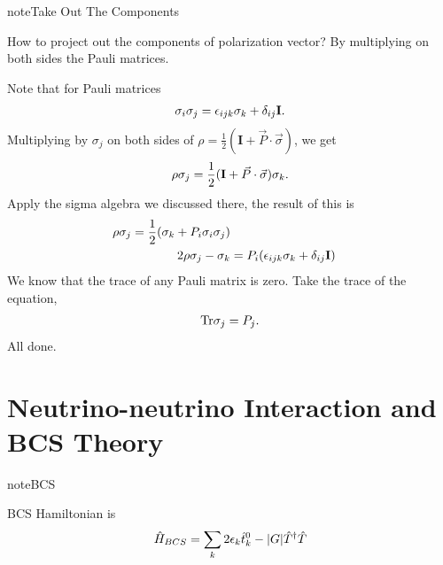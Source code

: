 \documentclass[letterpaper,12pt,english]{sphinxmanual}
\begin{document}
\begin{notice}{note}{Take Out The Components}

How to project out the components of polarization vector? By multiplying on both sides the Pauli matrices.

Note that for Pauli matrices
\begin{gather}
\begin{split}\sigma_i \sigma_j = \epsilon_{ijk}\sigma_k + \delta_{ij}\mathbf I.\end{split}\notag
\end{gather}
Multiplying by \(\sigma_j\) on both sides of \(\rho =  \frac 1 2(\mathbf I+\vec P \cdot\vec \sigma)\), we get
\begin{gather}
\begin{split}\rho \sigma_j  = \frac 1 2(\mathbf I+\vec P \cdot\vec \sigma)\sigma_k.\end{split}\notag
\end{gather}
Apply the sigma algebra we discussed there, the result of this is
\begin{gather}
\begin{split}\rho \sigma_j = \frac{1}{2}(\sigma_k + P_i \sigma_i \sigma_j) \\
2 \rho \sigma_j - \sigma_k &= P_i (\epsilon_{ijk}\sigma_k + \delta_{ij}\mathbf I)\end{split}\notag
\end{gather}
We know that the trace of any Pauli matrix is zero. Take the trace of the equation,
\begin{gather}
\begin{split}\mathrm{Tr}\sigma_j =  P_j.\end{split}\notag
\end{gather}
All done.
\end{notice}


\section{Neutrino-neutrino Interaction and BCS Theory}
\label{picture:neutrino-neutrino-interaction-and-bcs-theory}
\begin{notice}{note}{BCS}

BCS Hamiltonian is
\begin{gather}
\begin{split}\hat H_{BCS} = \sum_k 2 \epsilon_k \hat t_k^0- \lvert G\rvert \hat T^\dagger \hat T\end{split}\notag
\end{gather}\end{notice}
\end{document}
